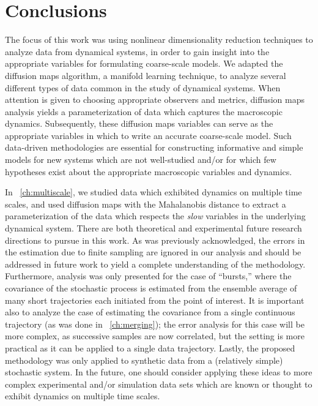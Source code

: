 
\chapter{Conclusions \label{ch:conclusion}}


The focus of this work was using nonlinear dimensionality reduction techniques to analyze data from dynamical systems, in order to gain insight into the appropriate variables for formulating coarse-scale models.
%
We adapted the diffusion maps algorithm, a manifold learning technique, to analyze several different types of data common in the study of dynamical systems.
%
When attention is given to choosing appropriate observers and metrics, diffusion maps analysis yields a parameterization of data which captures the macroscopic dynamics.
%
Subsequently, these diffusion maps variables can serve as the appropriate variables in which to write an accurate coarse-scale model.
%
Such data-driven methodologies are essential for constructing informative and simple models for new systems which are not well-studied and/or for which few hypotheses exist about the appropriate macroscopic variables and dynamics.

In \chap~\ref{ch:multiscale}, we studied data which exhibited dynamics on multiple time scales, and used diffusion maps with the Mahalanobis distance to extract a parameterization of the data which respects the {\em slow} variables in the underlying dynamical system.
%
There are both theoretical and experimental future research directions to pursue in this work.
%
As was previously acknowledged, the errors in the estimation due to finite sampling are ignored in our analysis and should be addressed in future work to yield a complete understanding of the methodology.
%
Furthermore, analysis was only presented for the case of ``bursts,'' where the covariance of the stochastic process is estimated from the ensemble average of many short trajectories each initiated from the point of interest.
%
It is important also to analyze the case of estimating the covariance from a single continuous trajectory (as was done in \chap~\ref{ch:merging}); the error analysis for this case will be more complex, as successive samples are now correlated, but the setting is more practical as it can be applied to a single data trajectory.
%
Lastly, the proposed methodology was only applied to synthetic data from a (relatively simple) stochastic system. 
%
In the future, one should consider applying these ideas to more complex experimental and/or simulation data sets which are known or thought to exhibit dynamics on multiple time scales.


